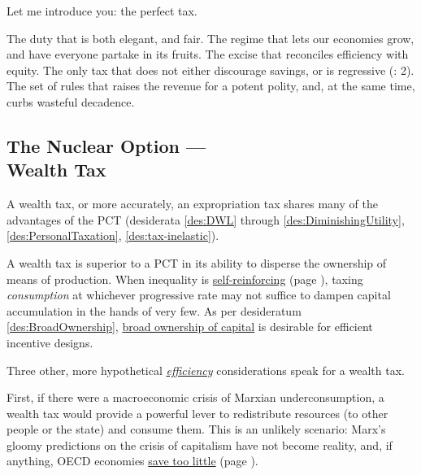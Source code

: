 Let me introduce you: the perfect tax.

The duty that is both elegant, and fair. The regime that lets our economies grow, and have everyone partake in its fruits. The excise that reconciles efficiency with equity. The only tax that does not either discourage savings, or is regressive (\citealt{Seidman1997}: 2). The set of rules that raises the revenue for a potent polity, and, at the same time, curbs wasteful decadence.

\subsection[Wealth Tax]{The Nuclear Option ---\\Wealth Tax} \label{sec:ScoreWT} A wealth tax, or more accurately, an expropriation tax shares many of the advantages of the PCT (desiderata \ref{des:DWL} through \ref{des:DiminishingUtility}, \ref{des:PersonalTaxation}, \ref{des:tax-inelastic}).

A wealth tax is superior to a PCT in its ability to disperse the ownership of means of production. When inequality is \hyperref[sec:GovDynofIneq]{self-reinforcing} (page \pageref{sec:GovDynofIneq}), taxing \emph{consumption} at whichever progressive rate may not suffice to dampen capital accumulation in the hands of very few. As per desideratum \ref{des:BroadOwnership}, \hyperref[des:BroadOwnership]{broad ownership of capital} is desirable for efficient incentive designs. %

Three other, more hypothetical \hyperref[sec:Efficiency]{\emph{efficiency}} considerations speak for a wealth tax.

First, if there were a macroeconomic crisis of Marxian %
underconsumption, a wealth tax would provide a powerful lever to redistribute resources (to other people or the state) and consume them. This is an unlikely scenario: Marx's gloomy predictions on the crisis of capitalism have not become reality, and, if anything, OECD economies \hyperref[des:Savings]{save too little} (page \pageref{des:Savings}). %

